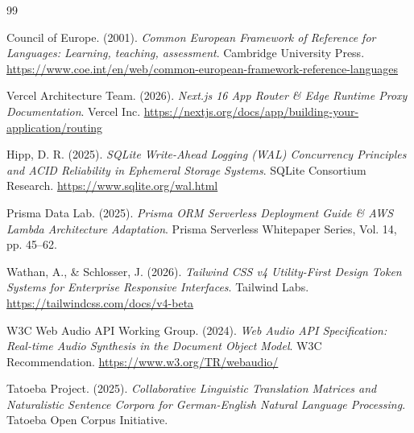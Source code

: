 \documentclass[12pt,a4paper]{article}
\begin{document}
\newpage
\begin{thebibliography}{99}
\small

Council of Europe. (2001). \textit{Common European Framework of Reference for Languages: Learning, teaching, assessment}. Cambridge University Press. \url{https://www.coe.int/en/web/common-european-framework-reference-languages}

Vercel Architecture Team. (2026). \textit{Next.js 16 App Router \& Edge Runtime Proxy Documentation}. Vercel Inc. \url{https://nextjs.org/docs/app/building-your-application/routing}

Hipp, D. R. (2025). \textit{SQLite Write-Ahead Logging (WAL) Concurrency Principles and ACID Reliability in Ephemeral Storage Systems}. SQLite Consortium Research. \url{https://www.sqlite.org/wal.html}

Prisma Data Lab. (2025). \textit{Prisma ORM Serverless Deployment Guide \& AWS Lambda Architecture Adaptation}. Prisma Serverless Whitepaper Series, Vol. 14, pp. 45--62.

Wathan, A., \& Schlosser, J. (2026). \textit{Tailwind CSS v4 Utility-First Design Token Systems for Enterprise Responsive Interfaces}. Tailwind Labs. \url{https://tailwindcss.com/docs/v4-beta}

W3C Web Audio API Working Group. (2024). \textit{Web Audio API Specification: Real-time Audio Synthesis in the Document Object Model}. W3C Recommendation. \url{https://www.w3.org/TR/webaudio/}

Tatoeba Project. (2025). \textit{Collaborative Linguistic Translation Matrices and Naturalistic Sentence Corpora for German-English Natural Language Processing}. Tatoeba Open Corpus Initiative.

\end{thebibliography}
\end{document}
